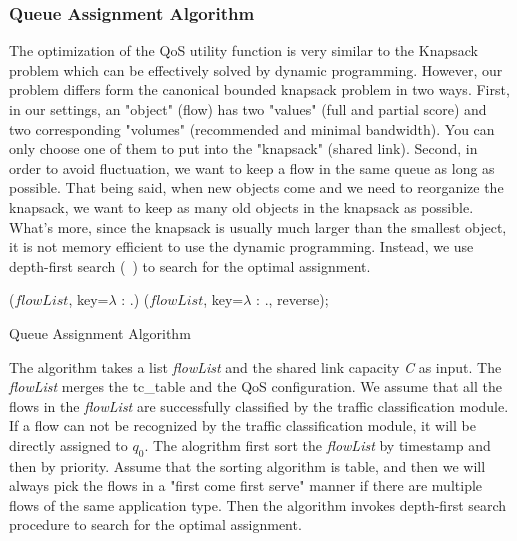 \subsubsection{Queue Assignment Algorithm}
\label{sect:queueAssignAlgo}

The optimization of the QoS utility function is very similar to the Knapsack problem  which can be effectively solved by dynamic
programming. However, our problem differs form the canonical bounded knapsack problem in two ways. First, in our settings, an "object" (flow) has
two "values" (full and partial score) and two corresponding "volumes" (recommended and minimal bandwidth). You can only choose one of them to put
into the "knapsack" (shared link). Second, in order to avoid fluctuation, we want to keep a flow in the same queue as long as possible. That being
said, when new objects come and we need to reorganize the knapsack, we want to keep as many old objects in the knapsack as possible. What's more,
since the knapsack is usually much larger than the smallest object, it is not memory efficient to use the dynamic programming. Instead, we use
depth-first search (~) to search for the optimal assignment.

\begin{algorithm}
    

  
  \Sort($flowList$, key=$\lambda$ \X: \X.\Timestamp)\;
  \Sort($flowList$, key=$\lambda$ \X: \X.\Priority, reverse);



  \caption{Queue Assignment Algorithm}\label{alg:queueAssignAlgo}
\end{algorithm}

The algorithm takes a list \emph{flowList} and the shared link capacity \emph{C} as input. The \emph{flowList} merges the tc\_table and the
QoS configuration. We assume that all the flows in the \emph{flowList} are successfully classified by the traffic classification module. If a flow
can not be recognized by the traffic classification module, it will be directly assigned to $q_0$. The alogrithm first sort the \emph{flowList} by
timestamp and then by priority. Assume that the sorting algorithm is table, and then we will always pick the flows in a "first come first serve" manner
if there are multiple flows of the same application type. Then the algorithm invokes depth-first search procedure to search for the optimal assignment.
